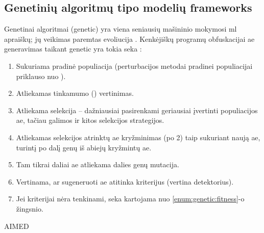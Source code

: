 \subsection{Genetinių algoritmų tipo modelių \glspl{framework}}\label{sec:literature:genetic}

Genetinai algoritmai (\acs{genetic}) yra viena seniausių mašininio mokymosi
\acs{ml} apraiškų; jų veikimas paremtas evoliucija
\cite{castroAIMEDEvolvingMalware2019}. Kenkėjiškų programų obfuskacijai
\acs{ae} generavimas taikant \acs{genetic} yra tokia seka
\cite{yusteOptimizationCodeCaves2022}:
\begin{enumerate}
    \item Sukuriama pradinė populiacija (perturbacijos metodai pradinei populiacijai
          priklauso nuo ).
    \item Atliekamas tinkamumo () vertinimas.\label{enum:genetic:fitness}
    \item Atliekama selekcija -- dažniausiai pasirenkami geriausiai įvertinti
          populiacijos \acs{ae}, tačiau galimos ir kitos selekcijos strategijos.
    \item Atliekamas selekcijos atrinktų \acs{ae} kryžminimas (po 2) taip sukuriant naują
          \acs{ae}, turintį po dalį genų iš abiejų kryžmintų \acs{ae}.
    \item Tam tikrai daliai \ac{ae} atliekama dalies genų mutacija.
    \item Vertinama, ar sugeneruoti \acs{ae} atitinka kriterijus (vertina detektorius).
    \item Jei kriterijai nėra tenkinami, seka kartojama nuo \ref{enum:genetic:fitness}-o
          žingsnio.
\end{enumerate}

\begin{describeFramework}{AIMED}{\cite{castroAIMEDEvolvingMalware2019}}
\end{describeFramework}

